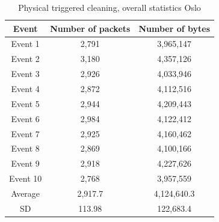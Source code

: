 \begin{table}[H]
\centering
\caption{Physical triggered cleaning, overall statistics Oslo}
\label{tab:PCoverallOSL}
\begin{tabular}{|c|c|c|}
\hline
\textbf{Event} & \textbf{Number of packets} & \textbf{Number of bytes} \\ \hline
Event 1        & 2,791                   & 3,965,147                   \\ \hline
Event 2        & 3,180                   & 4,357,126                   \\ \hline
Event 3        & 2,926                   & 4,033,946                   \\ \hline
Event 4        & 2,872                   & 4,112,516                   \\ \hline
Event 5        & 2,944                   & 4,209,443                   \\ \hline
Event 6        & 2,984                   & 4,122,412                   \\ \hline
Event 7        & 2,925                   & 4,160,462                   \\ \hline
Event 8        & 2,869                   & 4,100,166                   \\ \hline
Event 9        & 2,918                   & 4,227,626                   \\ \hline
Event 10       & 2,768                   & 3,957,559                   \\ \hline
Average        & 2,917.7                 & 4,124,640.3                 \\ \hline
SD        & 113.98
       & 122,683.4               \\ \hline
\end{tabular}
\end{table}

